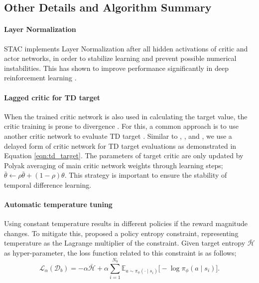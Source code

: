 \documentclass{article}
\begin{document}
\subsection{Other Details and Algorithm Summary}

\paragraph{Layer Normalization} 
STAC implements Layer Normalization \citep{ba2016layer} after all hidden activations of critic and actor networks, in order to stabilize learning and prevent possible numerical instabilities. This has shown to improve performance significantly in deep reinforcement learning \citep{nauman2024overestimation, hiraoka2021dropout}. 

\paragraph{Lagged critic for TD target}
When the trained critic network is also used in calculating the target value, the critic training is prone to divergence \citep{li2023realistic}. For this, a common approach is to use another critic network to evaluate TD target \citep{mnih2013playing}. Similar to \citet{lillicrap2015continuous}, \citet{fujimoto2018addressing}, and \citet{haarnoja2018soft}, we use a delayed form of critic network for TD target evaluations as demonstrated in Equation \ref{eqn:td_target}. The parameters of target critic are only updated by Polyak averaging of main critic network weights through learning steps; $\bar{\theta} \leftarrow \rho \bar{\theta} + (1-\rho) \theta $. This strategy is important to ensure the stability of temporal difference learning. 

\paragraph{Automatic temperature tuning} Using constant temperature results in different policies if the reward magnitude changes. To mitigate this, \citet{haarnoja2018soft} proposed a policy entropy constraint, representing temperature as the Lagrange multiplier of the constraint. Given target entropy $\mathcal{\bar{H}}$ as hyper-parameter, the loss function related to this constraint is as follows;  
\begin{equation}
	\mathcal{L}_{\alpha}(\mathcal{D}_b) = - \alpha \mathcal{\bar{H}} + \alpha \sum_{i=1}^{N_b} \mathbb{E}_{a\sim\pi_{\phi}(\cdot \mid s_i)} \big[ -\log \pi_{\phi}(a \mid s_i) \big].  
\end{equation} 
\end{document}
